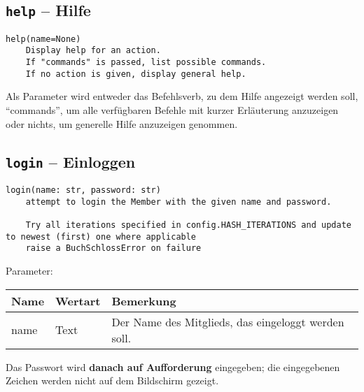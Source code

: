 %
%
%

\subsection{\texttt{help} -- Hilfe}
\label{subsec:command_list:help}

\begin{verbatim}
help(name=None)
    Display help for an action.
    If "commands" is passed, list possible commands.
    If no action is given, display general help.
\end{verbatim}

Als Parameter wird entweder das Befehlsverb, zu dem Hilfe angezeigt werden soll, ``commands'', um alle verfügbaren Befehle mit kurzer Erläuterung anzuzeigen oder nichts, um generelle Hilfe anzuzeigen genommen.


\subsection{\texttt{login} -- Einloggen}
\label{subsec:command_list:login}

\begin{verbatim}
login(name: str, password: str)
    attempt to login the Member with the given name and password.

    Try all iterations specified in config.HASH_ITERATIONS and update to newest (first) one where applicable
    raise a BuchSchlossError on failure
\end{verbatim}

Parameter:

\begin{tabular}{|p{}|p{}|p{}|}
Name & Wertart & Bemerkung \\
\hline
name & Text & Der Name des Mitglieds, das eingeloggt werden soll.
\end{tabular}

Das Passwort wird \textbf{danach auf Aufforderung} eingegeben; die eingegebenen Zeichen werden nicht auf dem Bildschirm gezeigt.

